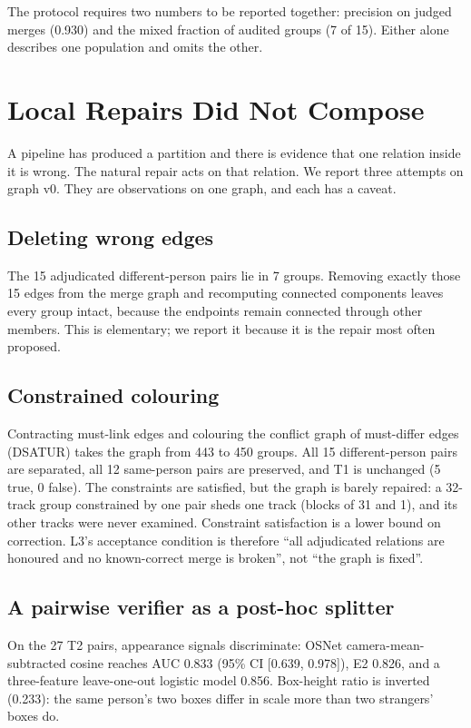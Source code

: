 \documentclass[journal]{IEEEtran}
\begin{document}
The protocol requires two numbers to be reported together: precision on judged merges (0.930) and the mixed fraction of audited groups (7 of 15). Either alone describes one population and omits the other.

\section{Local Repairs Did Not Compose}\label{sec:noncomp}
A pipeline has produced a partition and there is evidence that one relation inside it is wrong. The natural repair acts on that relation. We report three attempts on graph v0. They are observations on one graph, and each has a caveat.

\subsection{Deleting wrong edges}
The 15 adjudicated different-person pairs lie in 7 groups. Removing exactly those 15 edges from the merge graph and recomputing connected components leaves every group intact, because the endpoints remain connected through other members. This is elementary; we report it because it is the repair most often proposed.

\subsection{Constrained colouring}
Contracting must-link edges and colouring the conflict graph of must-differ edges (DSATUR) takes the graph from 443 to 450 groups. All 15 different-person pairs are separated, all 12 same-person pairs are preserved, and T1 is unchanged (5 true, 0 false). The constraints are satisfied, but the graph is barely repaired: a 32-track group constrained by one pair sheds one track (blocks of 31 and 1), and its other tracks were never examined. Constraint satisfaction is a lower bound on correction. L3's acceptance condition is therefore ``all adjudicated relations are honoured and no known-correct merge is broken'', not ``the graph is fixed''.

\subsection{A pairwise verifier as a post-hoc splitter}
On the 27 T2 pairs, appearance signals discriminate: OSNet camera-mean-subtracted cosine reaches AUC 0.833 (95\% CI [0.639, 0.978]), E2 0.826, and a three-feature leave-one-out logistic model 0.856. Box-height ratio is inverted (0.233): the same person's two boxes differ in scale more than two strangers' boxes do.
\end{document}
